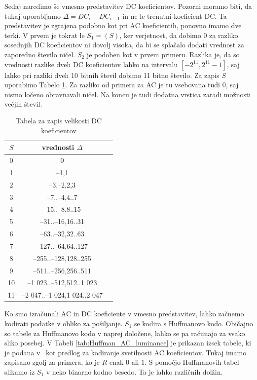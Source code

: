 \documentclass[a4paper,12pt,openright]{book}
\begin{document}
Sedaj naredimo še vmesno predstavitev DC koeficientov. Pozorni moramo biti, da tukaj uporabljamo $\Delta = DC_i - DC_{i-1}$ in ne le trenutni koeficient DC. Ta predstavitev je zgrajena podobno kot pri AC koeficientih, ponovno imamo dve terki. V prvem je tokrat le $S_1 = (S)$, ker verjetnost, da dobimo 0 za razliko sosednjih DC koeficientov ni dovolj visoka, da bi se splačalo dodati vrednost za zaporedno število ničel. $S_2$ je podoben kot v prvem primeru. Razlika je, da so vrednosti razlike dveh DC koeficientov lahko na intervalu $\left[-2^{11},2^{11}-1\right]$, saj lahko pri razliki dveh 10 bitnih števil dobimo 11 bitno število. Za zapis $S$ uporabimo Tabelo \ref{tab:Velikost_DC}. Za razliko od primera za AC je tu vsebovana tudi 0, saj nismo ločeno obravnavali ničel. Na koncu je tudi dodatna vrstica zaradi možnosti večjih števil.\par
\begin{table}[ht]
\centering
\begin{tabular}{|c|c|c|}
\hline
$S$& vrednosti $\Delta$\\
\hline
 0& 0\\
 1& –1,1\\
 2& –3,–2,2,3\\
 3& –7..–4,4..7\\
 4& –15..–8,8..15\\
 5& –31..–16,16..31\\
 6& –63..–32,32..63\\
 7& –127..–64,64..127\\
 8& –255..–128,128..255\\
 9& –511..–256,256..511\\
10& –1 023..–512,512..1 023\\
11& –2 047..–1 024,1 024..2 047\\
\hline
\end{tabular}
\caption{Tabela za zapis velikosti DC koeficientov}
\label{tab:Velikost_DC}
\end{table}
Ko smo izračunali AC in DC koeficiente v vmesno predstavitev, lahko začnemo kodirati podatke v obliko za pošiljanje. $S_1$ se kodira s Huffmanovo kodo. Običajno so tabele za Huffmanovo kodo v naprej določene, lahko se pa računajo za vsako sliko posebej. V Tabeli \ref{tab:Huffman_AC_luminance} je prikazan izsek tabele, ki je podana v~\cite{ISO/IEC_10918-1} kot predlog za kodiranje svetilnosti AC koeficientov. Tukaj imamo zapisano zgolj za primera, ko je $R$ enak 0 ali 1. S pomočjo Huffmanovih tabel slikamo iz $S_1$ v neko binarno kodno besedo. Ta je lahko različnih dolžin. \par
\end{document}
